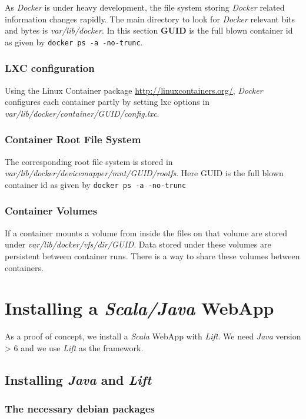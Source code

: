 \documentclass[11pt]{article}
\begin{document}
As \emph{Docker} is under heavy development, the file system storing \emph{Docker} related information changes rapidly. The main directory to look for \emph{Docker} relevant bits and bytes is \emph{var/lib/docker}. In this section \textbf{GUID} is the full blown container id as given by \texttt{docker ps -a -no-trunc}.
\subsubsection{LXC configuration}
\label{sec-2-6-1}

Using the Linux Container package \href{file://./lxc/}{http://linuxcontainers.org/}, \emph{Docker} configures each container partly by setting lxc options in \emph{var/lib/docker/container/GUID/config.lxc}. 
\subsubsection{Container Root File System}
\label{sec-2-6-2}

The corresponding root file system is stored in \emph{var/lib/docker/devicemapper/mnt/GUID/rootfs}.
Here GUID is the full blown container id as given by \texttt{docker ps -a -no-trunc}  
\subsubsection{Container Volumes}
\label{sec-2-6-3}

If a container mounts a volume from inside the files on that volume are stored under \emph{var/lib/docker/vfs/dir/GUID}. Data stored under these volumes are persistent between container runs. There is a way to share these volumes between containers. 
\section{Installing a \emph{Scala/Java} WebApp}
\label{sec-3}

As a proof of concept, we install a \emph{Scala} WebApp with \emph{Lift}. We need \emph{Java} version > 6 and we use \emph{Lift} as the framework. 
\subsection{Installing \emph{Java} and \emph{Lift}}
\label{sec-3-1}
\subsubsection{The necessary debian packages}
\label{sec-3-1-1}
\end{document}
